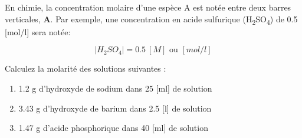\documentclass[
  11pt,
  a4paper,
  openany]{book}
\providecommand{\tightlist}{%
  \setlength{\itemsep}{0pt}\setlength{\parskip}{0pt}}
\begin{document}
En chimie, la concentration molaire d'une espèce A est notée entre deux barres verticales, \textbf{\textbar A\textbar{}}. Par exemple, une concentration en acide sulfurique (H\textsubscript{2}SO\textsubscript{4}) de 0.5 {[}mol/l{]} sera notée:

\[ |H_2SO_4| = 0.5\ [M] \text{ ou } [mol/l] \]

\begin{Exercise}

Calculez la molarité des solutions suivantes :

\begin{enumerate}
\def\labelenumi{\arabic{enumi}.}
\tightlist
\item
  1.2 g d'hydroxyde de sodium dans 25 {[}ml{]} de solution
\item
  3.43 g d'hydroxyde de barium dans 2.5 {[}l{]} de solution
\item
  1.47 g d'acide phosphorique dans 40 {[}ml{]} de solution
\end{enumerate}

\end{Exercise}
\end{document}
